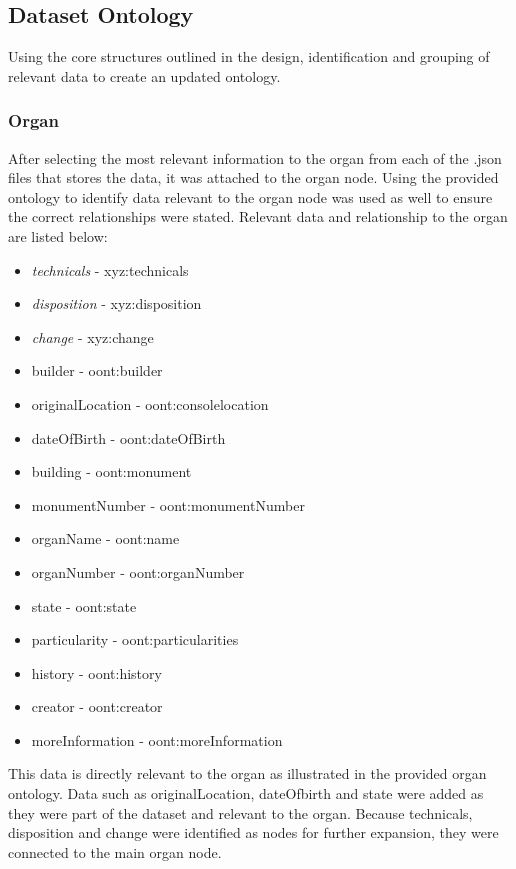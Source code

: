 \subsection{Dataset Ontology}
\hspace*{0.5cm} Using the core structures outlined in the design, identification and grouping of relevant data to create an updated ontology. 

\subsubsection{Organ}
\hspace*{0.5cm} After selecting the most relevant information to the organ from each of the .json files that stores the data, it was attached to the organ node. Using the provided ontology to identify data relevant to the organ node was used as well to ensure the correct relationships were stated. Relevant data and relationship to the organ are listed below:

\begin{itemize}
    \itemsep0em 
    \item \textit{technicals} - xyz:technicals
    \item \textit{disposition} - xyz:disposition
    \item \textit{change} - xyz:change
    \item builder - oont:builder
    \item originalLocation - oont:consolelocation
    \item dateOfBirth - oont:dateOfBirth
    \item building - oont:monument
    \item monumentNumber - oont:monumentNumber
    \item organName - oont:name
    \item organNumber - oont:organNumber 
    \item state - oont:state 
    \item particularity - oont:particularities
    \item history - oont:history
    \item creator - oont:creator
    \item moreInformation - oont:moreInformation 
\end{itemize}

This data is directly relevant to the organ as illustrated in the provided organ ontology. Data such as originalLocation, dateOfbirth and state were added as they were part of the dataset and relevant to the organ. Because technicals, disposition and change were identified as nodes for further expansion, they were connected to the main organ node. 

